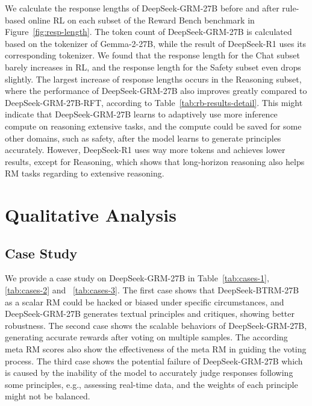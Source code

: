 \documentclass{article} %
\newcommand{\SGRM}{DeepSeek-GRM-27B\xspace}
\newcommand{\SGRMRFT}{DeepSeek-GRM-27B-RFT\xspace}
\newcommand{\BTRM}{DeepSeek-BTRM\xspace}
\begin{document}
We calculate the response lengths of \SGRM before and after rule-based online RL on each subset of the Reward Bench benchmark in Figure~\ref{fig:resp-length}. The token count of \SGRM is calculated based on the tokenizer of Gemma-2-27B, while the result of DeepSeek-R1 uses its corresponding tokenizer. We found that the response length for the Chat subset barely increases in RL, and the response length for the Safety subset even drops slightly. The largest increase of response lengths occurs in the Reasoning subset, where the performance of \SGRM also improves greatly compared to \SGRMRFT, according to Table~\ref{tab:rb-results-detail}. 
This might indicate that \SGRM learns to adaptively use more inference compute on reasoning extensive tasks, and the compute could be saved for some other domains, such as safety, after the model learns to generate principles accurately. 
However, DeepSeek-R1 uses way more tokens and achieves lower results, except for Reasoning, which shows that long-horizon reasoning also helps RM tasks regarding to extensive reasoning. 


\section{Qualitative Analysis}

\subsection{Case Study}


We provide a case study on \SGRM in Table~\ref{tab:cases-1}, \ref{tab:cases-2} and ~\ref{tab:cases-3}. The first case shows that \BTRM-27B as a scalar RM could be hacked or biased under specific circumstances, and \SGRM generates textual principles and critiques, showing better robustness. The second case shows the scalable behaviors of \SGRM, generating accurate rewards after voting on multiple samples. The according meta RM scores also show the effectiveness of the meta RM in guiding the voting process. The third case shows the potential failure of \SGRM which is caused by the inability of the model to accurately judge responses following some principles, e.g., assessing real-time data, and the weights of each principle might not be balanced. 
\end{document}
